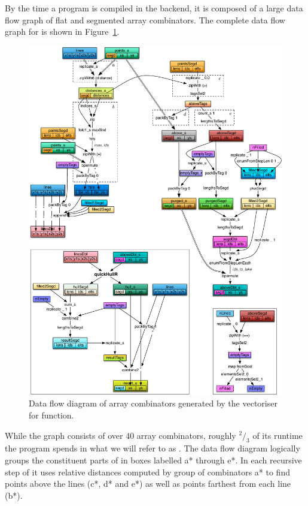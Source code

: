 \documentclass[preamble.tex]{subfiles}
\begin{document}
By the time a \DPH program is compiled in the backend, it is composed of a large data flow graph of flat and segmented array combinators. The complete data flow graph for \QuickHull is shown in Figure~\ref{fig:DFD-QuickHull}.


\begin{figure}
\includegraphics[width=1.1\textwidth, center]{img/DFD-QuickHull}
\caption{Data flow diagram of array combinators generated by the vectoriser for  function.}
\label{fig:DFD-QuickHull}
\end{figure}


While the graph consists of over 40 array combinators, roughly $^2/_3$ of its runtime the \QuickHull program spends in what we will refer to as . The data flow diagram logically groups the constituent parts of \FilterMax in boxes labelled \*a* through \*e*. In each recursive step of \QuickHull it uses relative distances computed by group of combinators \*a* to find points above the lines (\*c*, \*d* and \*e*) as well as points farthest from each line (\*b*).
\end{document}
